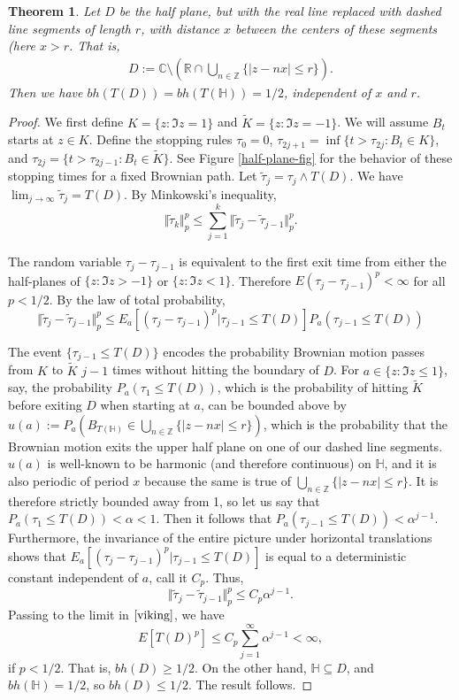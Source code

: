 \documentclass[a4paper, oneside, 12pt]{amsart}
\newcommand{\mb}{\mathbb}
\newcommand{\HH}{\mathbb{H}}
\newcommand{\til}{\tilde}
\newtheorem{theorem}{Theorem}[section]
\begin{document}
\begin{theorem} \label{halfplane}
    Let $D$ be the half plane, but with the real line replaced with dashed line segments
    of length $r$, with distance $x$ between the centers of these segments (here $x > r$. That is,
    \begin{align*} D := \mb{C} \setminus \left(\mb{R}\cap
        \bigcup_{n\in\mb{Z}} \{|z-nx|\leq r\}\right).\end{align*} Then we have
        $bh(T(D)) = bh(T(\HH)) = 1/2$, independent of $x$ and $r$.
\end{theorem}
\begin{proof}
   We first define $K = \{z:\Im{z} = 1\}$ and $\tilde K = \{z:\Im{z} = -1\}$. We will assume $B_t$ starts at $z\in K$. 
   Define the stopping rules $\tau_0 = 0$, $\tau_{2j+1} =\inf\{t>\tau_{2j}:B_t\in K\}$, and $\tau_{2j} = \{t>\tau_{2j-1}: B_t\in \tilde K\}$. See Figure \ref{half-plane-fig} for the behavior of these stopping times for a fixed Brownian path. Let $\tilde \tau_j = 
   \tau_j\wedge T(D)$. We have $\lim_{j\to\infty} \tilde\tau_j = T(D)$. By
   Minkowski's inequality,
\begin{equation} \label{viking}
        \Vert\tilde \tau_k\Vert_p^p \leq \sum_{j=1}^k \Vert\til\tau_j - 
        \til\tau_{j-1}\Vert_p^p.
\end{equation}   

   The random variable $\tau_j - \tau_{j-1}$ is
   equivalent to the first exit time from either the half-planes of  $\{z:\Im{z} > -1\}$ or 
   $\{z:\Im{z}<1\}$. Therefore $E(\tau_j-\tau_{j-1})^p <\infty$ for all $p < 1/2$. By the law of total probability,
   $$
        \Vert\til\tau_j - 
        \til\tau_{j-1}\Vert_p^p \leq  E_a[(\tau_j-\tau_{j-1})^p|\tau_{j-1}\leq T(D)]P_a(\tau_{j-1}\leq T(D))
   $$
   
   The event
   $\{\tau_{j-1}\leq T(D)\}$ encodes the probability Brownian
   motion passes from $K$ to $\tilde K$ $j-1$ times without hitting the 
   boundary of $D$. For $a \in \{z:\Im{z} \leq 1\}$, say, the probability $P_a(\tau_{1}\leq T(D))$, which is the probability of hitting $\tilde K$ before exiting $D$ when starting at $a$, can be bounded above by $u(a) := P_a(B_{T(\HH)} \in \bigcup_{n\in\mb{Z}} \{|z-nx| \leq r\})$, which is the probability that the Brownian motion exits the upper half plane on one of our dashed line segments. $u(a)$ is well-known to be harmonic (and therefore continuous) on $\HH$, and it is also periodic of period $x$ because the same is true of  $\bigcup_{n\in\mb{Z}} \{|z-nx| \leq r\}$. It is therefore strictly bounded away from 1, so let us say that $P_a(\tau_{1}\leq T(D))<\alpha<1$. Then it follows that $P_a(\tau_{j-1}\leq T(D)) < \alpha^{j-1}$. Furthermore, the invariance of the entire picture under horizontal translations shows that $E_a[(\tau_j-\tau_{j-1})^p|\tau_{j-1}\leq T(D)]$ is equal to a deterministic constant independent of $a$, call it $C_p$. Thus,
   $$
   \Vert\til\tau_j - 
        \til\tau_{j-1}\Vert_p^p \leq C_p \alpha^{j-1}.
   $$
   Passing to the limit in $\eqref{viking}$, we have
   $$
   E[T(D)^p] \leq C_p \sum_{j=1}^\infty \alpha^{j-1} < \infty,
   $$
   if $p<1/2$. That is, $bh(D) \geq 1/2$. On the other hand, $\HH \subseteq D$, and $bh(\HH) = 1/2$, so $bh(D) \leq 1/2$. The result follows.
\end{proof}
\end{document}
